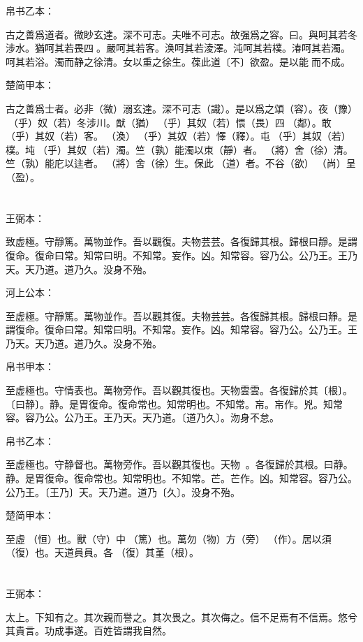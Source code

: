 \documentclass[a5paper]{ctexbook}
\begin{document}
    帛书乙本：

    古之善爲道者。微眇玄達。深不可志。夫唯不可志。故强爲之容。曰。與呵其若冬涉水。猶呵其若畏四𠳵。嚴呵其若客。涣呵其若淩澤。沌呵其若樸。湷呵其若濁。𣼥呵其若浴。濁而静之徐清。女以重之徐生。葆此道〔不〕欲盈。是以能𧝬而不成。

    楚简甲本：

    古之善爲士者。必非（微）溺玄達。深不可志（識）。是以爲之頌（容）。夜（豫）󶴋（乎）奴（若）冬涉川。猷（猶）󶴋（乎）其奴（若）愄（畏）四𠳵（鄰）。敢󶴋（乎）其奴（若）客。󶴝（渙）󶴋（乎）其奴（若）懌（釋）。屯󶴋（乎）其奴（若）樸。坉󶴋（乎）其奴（若）濁。竺（孰）能濁以朿（靜）者。𨟻（將）舍（徐）清。竺（孰）能庀以迬者。𨟻（將）舍（徐）生。保此𧗟（道）者。不谷（欲）󶴞（尚）呈（盈）。

    \chapter{}
    王弼本：

    致虚極。守靜篤。萬物並作。吾以觀復。夫物芸芸。各復歸其根。歸根曰靜。是謂復命。復命曰常。知常曰明。不知常。妄作。凶。知常容。容乃公。公乃王。王乃天。天乃道。道乃久。没身不殆。

    河上公本：

    至虚極。守靜篤。萬物並作。吾以觀其復。夫物芸芸。各復歸其根。歸根曰靜。是謂復命。復命曰常。知常曰明。不知常。妄作。凶。知常容。容乃公。公乃王。王乃天。天乃道。道乃久。没身不殆。

    帛书甲本：

    至虚極也。守情表也。萬物旁作。吾以觀其復也。天物雲雲。各復歸於其〔根〕。〔曰静〕。静。是胃復命。復命常也。知常明也。不知常。㠵。㠵作。兇。知常容。容乃公。公乃王。王乃天。天乃道。〔道乃久〕。沕身不怠。

    帛书乙本：

    至虚極也。守静督也。萬物旁作。吾以觀其復也。天物𥘟𥘟。各復歸於其根。曰静。静。是胃復命。復命常也。知常明也。不知常。芒。芒作。凶。知常容。容乃公。公乃王。〔王乃〕天。天乃道。道乃〔久〕。没身不殆。

    楚简甲本：

    至虛𠄨（恒）也。獸（守）中󶴮（篤）也。萬勿（物）方（旁）󶴮（作）。居以須󵯿（復）也。天道員員。各󵯿（復）其堇（根）。

    \chapter{}
    王弼本：

    太上。下知有之。其次親而譽之。其次畏之。其次侮之。信不足焉有不信焉。悠兮其貴言。功成事遂。百姓皆謂我自然。
\end{document}
